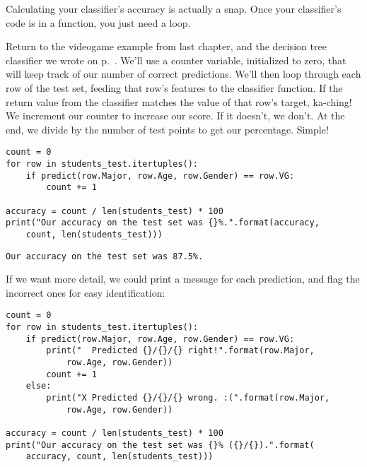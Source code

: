 Calculating your classifier's accuracy is actually a snap. Once your
classifier's code is in a function, you just need a loop.

Return to the videogame example from last chapter, and the decision tree
classifier we wrote on p.~\pageref{fig:completeVgTreePython}. We'll use a
counter variable, initialized to zero, that will keep track of our number of
correct predictions. We'll then loop through each row of the test set, feeding
that row's features to the classifier function. If the return value from the
classifier matches the value of that row's target, ka-ching! We increment our
counter to increase our score. If it doesn't, we don't. At the end, we divide
by the number of test points to get our percentage. Simple!

\begin{Verbatim}[fontsize=\footnotesize,samepage=true,frame=single,framesep=3mm]
count = 0
for row in students_test.itertuples():
    if predict(row.Major, row.Age, row.Gender) == row.VG:
        count += 1

accuracy = count / len(students_test) * 100
print("Our accuracy on the test set was {}%.".format(accuracy,
    count, len(students_test)))
\end{Verbatim}
\vspace{-.3in}

\begin{Verbatim}[fontsize=\small,samepage=true,frame=leftline,framesep=5mm,framerule=1mm]
Our accuracy on the test set was 87.5%.
\end{Verbatim}

\smallskip

If we want more detail, we could print a message for each prediction, and flag
the incorrect ones for easy identification:

\begin{Verbatim}[fontsize=\footnotesize,samepage=true,frame=single,framesep=3mm]
count = 0
for row in students_test.itertuples():
    if predict(row.Major, row.Age, row.Gender) == row.VG:
        print("  Predicted {}/{}/{} right!".format(row.Major,
            row.Age, row.Gender))
        count += 1
    else:
        print("X Predicted {}/{}/{} wrong. :(".format(row.Major,
            row.Age, row.Gender))

accuracy = count / len(students_test) * 100
print("Our accuracy on the test set was {}% ({}/{}).".format(
    accuracy, count, len(students_test)))
\end{Verbatim}
\vspace{-.3in}

